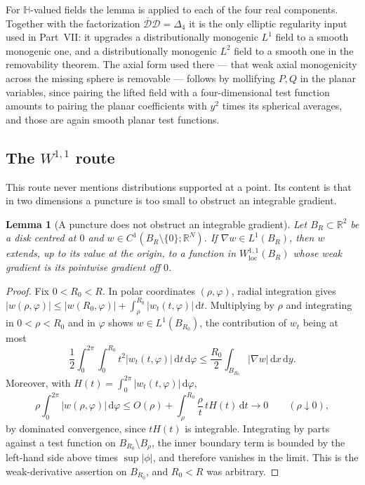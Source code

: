\documentclass[11pt,a4paper]{article}
\numberwithin{equation}{section}
\newtheorem{lemma}[theorem]{Lemma}
\theoremstyle{definition}
\theoremstyle{remark}
\theoremstyle{plain}
\newcommand{\HH}{\mathbb H}
\newcommand{\RR}{\mathbb R}
\newcommand{\Dop}{\mathcal D}
\newcommand{\lap}{\Delta_4}
\newcommand{\abs}[1]{\lvert #1\rvert}
\newcommand{\dd}{\mathrm d}
\begin{document}
For $\HH$-valued fields the lemma is applied to each of the four real
components. Together with the factorization $\overline{\Dop}\Dop=\lap$ it
is the only elliptic regularity input used in Part~VII: it upgrades a
distributionally monogenic $L^1$ field to a smooth monogenic one, and a
distributionally monogenic $L^2$ field to a smooth one in the removability
theorem. The axial form used there --- that weak axial monogenicity across
the missing sphere is removable --- follows by mollifying $P,Q$ in the
planar variables, since pairing the lifted field with a four-dimensional
test function amounts to pairing the planar coefficients with $y^2$ times
its spherical averages, and those are again smooth planar test functions.

\subsection{The $W^{1,1}$ route}
\label{f:sub:W11}

This route never mentions distributions supported at a point. Its content
is that in two dimensions a puncture is too small to obstruct an integrable
gradient.

\begin{lemma}[A puncture does not obstruct an integrable gradient]
\label{f:lem:W11}
Let $B_R\subset\RR^2$ be a disk centred at $0$ and
$w\in C^1(B_R\setminus\{0\};\RR^N)$. If $\nabla w\in L^1(B_R)$, then $w$
extends, up to its value at the origin, to a function in
$W^{1,1}_{\mathrm{loc}}(B_R)$ whose weak gradient is its pointwise gradient
off $0$.
\end{lemma}
\begin{proof}
Fix $0<R_0<R$. In polar coordinates $(\rho,\varphi)$, radial integration
gives $\abs{w(\rho,\varphi)}\le\abs{w(R_0,\varphi)}
+\int_\rho^{R_0}\abs{w_t(t,\varphi)}\,\dd t$. Multiplying by $\rho$ and
integrating in $0<\rho<R_0$ and in $\varphi$ shows $w\in L^1(B_{R_0})$, the
contribution of $w_t$ being at most
\[
 \frac12\int_0^{2\pi}\!\!\int_0^{R_0}t^2\abs{w_t(t,\varphi)}
 \,\dd t\,\dd\varphi
 \le\frac{R_0}{2}\int_{B_{R_0}}\abs{\nabla w}\,\dd x\,\dd y .
\]
Moreover, with $H(t)=\int_0^{2\pi}\abs{w_t(t,\varphi)}\,\dd\varphi$,
\[
 \rho\int_0^{2\pi}\abs{w(\rho,\varphi)}\,\dd\varphi
 \le O(\rho)+\int_\rho^{R_0}\frac{\rho}{t}\,tH(t)\,\dd t\longrightarrow0
 \qquad(\rho\downarrow0),
\]
by dominated convergence, since $tH(t)$ is integrable. Integrating by parts
against a test function on $B_{R_0}\setminus B_\rho$, the inner boundary
term is bounded by the left-hand side above times $\sup\abs\phi$, and
therefore vanishes in the limit. This is the weak-derivative assertion on
$B_{R_0}$, and $R_0<R$ was arbitrary.
\end{proof}
\end{document}
